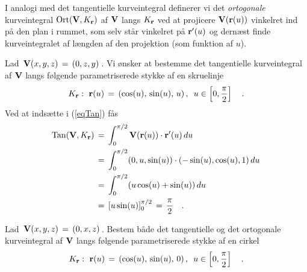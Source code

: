 \begin{definition}
I analogi med det tangentielle kurveintegral definerer vi det {\em ortogonale} kurveintegral
$\operatorname{Ort}({\bf V}, K_{\bf r})$ af ${\bf V}$ langs $K_{\bf r}$ ved at
projicere ${\bf V}({\bf r}(u))$ vinkelret ind på den plan i rummet, som selv står
vinkelret på ${\bf r}'(u)$ og dernæst finde kurveintegralet af
længden af den projektion (som funktion af $u$).
\end{definition}




\begin{example}
Lad $\, {\bf V}(x,y,z)\, = \, (0, z, y) \,$. Vi ønsker at bestemme
det tangentielle kurveintegral af ${\bf V}$ langs følgende
parametriserede stykke af en skruelinje
\begin{equation}K_{\bf r}: \,\, {\bf
r}(u) \, = \, \left(\cos(u), \,\sin(u),\, u\right), \, \, \, u \in
\left[0, \frac{\pi}{2}\right]\quad .
\end{equation}
Ved at indsætte i (\ref{eqTan}) fås
\begin{equation}
\begin{aligned}
\operatorname{Tan}({\bf V}, K_{\bf r})\, &= \,\int_{0}^{\pi/2}{\bf V}({\bf
r}(u))\cdot {\bf r}'(u)\,du \, \\ &= \, \int_{0}^{\pi/2}(0, u,
\sin(u))\cdot (-\sin(u), \cos(u), 1)\,du \, \\ &= \,
\int_{0}^{\pi/2}(u\cos(u) + \sin(u))\,du \, \\ &= \,
[u\sin(u)]_{0}^{\pi/2} \, = \, \frac{\pi}{2}\quad .
\end{aligned}
\end{equation}
\end{example}

\begin{exercise}
Lad $\, {\bf V}(x,y,z)\, = \, (0, x, z) \,$. Bestem både det
tangentielle og det ortogonale kurveintegral af ${\bf V}$ langs
følgende parametriserede stykke af en cirkel
\begin{equation}
K_{\bf r}: \,\, {\bf
r}(u) \, = \, \left(\cos(u), \,\sin(u),\, 0\right), \, \, \, u \in
\left[ 0, \frac{\pi}{2}\right]\quad .
\end{equation}
\end{exercise}



